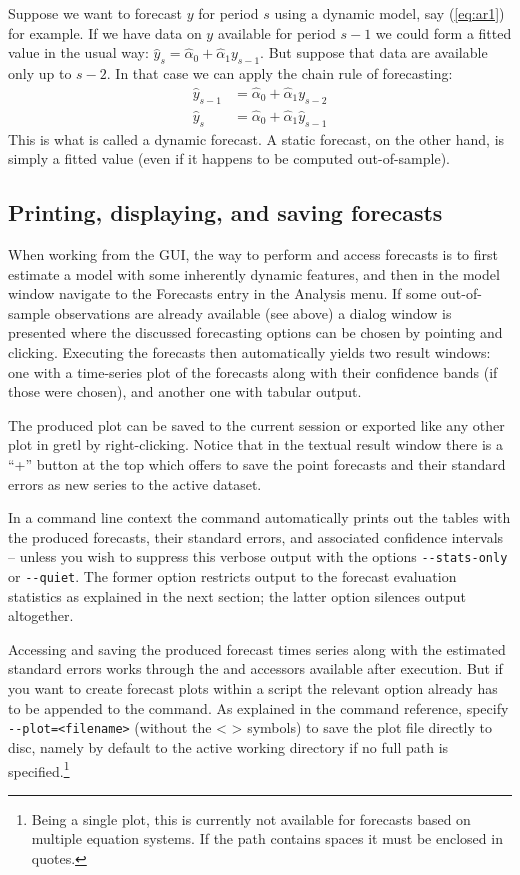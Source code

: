 Suppose we want to forecast $y$ for period $s$ using a dynamic model,
say (\ref{eq:ar1}) for example.  If we have data on $y$ available for
period $s-1$ we could form a fitted value in the usual way: $\hat{y}_s
= \hat{\alpha}_0 + \hat{\alpha}_1 y_{s-1}$.  But suppose that data are
available only up to $s-2$.  In that case we can apply the chain rule
of forecasting:
%
\begin{align*}
  \hat{y}_{s-1} &= \hat{\alpha}_0 + \hat{\alpha}_1 y_{s-2} \\
  \hat{y}_{s} &= \hat{\alpha}_0 + \hat{\alpha}_1 \hat{y}_{s-1}
\end{align*}
%
This is what is called a dynamic forecast.  A static forecast, on the
other hand, is simply a fitted value (even if it happens to be computed
out-of-sample).

\subsection{Printing, displaying, and saving forecasts}

When working from the GUI, the way to perform and access forecasts is to
first estimate a model with some inherently dynamic features, and then 
in the model window navigate to the Forecasts entry in the Analysis 
menu. If some out-of-sample observations are already available (see 
above) a dialog window is presented where the discussed forecasting 
options can be chosen by pointing and clicking. Executing the forecasts
then automatically yields two result windows: one with a time-series
plot of the forecasts along with their confidence bands (if those were
chosen), and another one with tabular output.

The produced plot can be saved to the current session or exported like
any other plot in gretl by right-clicking. Notice that in the textual
result window there is a ``+'' button at the top which offers to save
the point forecasts and their standard errors as new series to the
active dataset. 

In a command line context the  command automatically prints 
out the tables with the produced forecasts, their standard errors, and 
associated confidence intervals -- unless you wish to suppress this 
verbose output with the options \verb|--stats-only| or \verb|--quiet|. 
The former option restricts output to the forecast evaluation statistics
as explained in the next section; the latter option silences output 
altogether.   

Accessing and saving the produced forecast times series along with the 
estimated standard errors works through 
the  and  accessors available after 
 execution. But if you want to create forecast plots within a
script the relevant option already has to be appended to the 
command. As explained in the 
command reference, specify \verb|--plot=<filename>| (without the < > 
symbols) to save the plot file directly to disc, namely by default to 
the active working directory if no full path is specified.\footnote{%
Being a single plot, this is currently not available
for forecasts based on multiple equation systems. If the path contains
spaces it must be enclosed in quotes.} 

